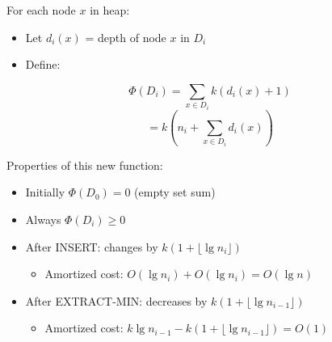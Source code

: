 \documentclass[11pt]{article}
\theoremstyle{definition}
\begin{document}
For each node $x$ in heap:
\begin{itemize}
  \item Let $d_i(x)$ = depth of node $x$ in $D_i$
  \item Define:
\end{itemize}

\[
\Phi(D_i) = \sum_{x \in D_i} k(d_i(x) + 1)
\]
\[
= k\left(n_i + \sum_{x \in D_i} d_i(x)\right)
\]

Properties of this new function:
\begin{itemize}
  \item Initially $\Phi(D_0) = 0$ (empty set sum)
  \item Always $\Phi(D_i) \geq 0$
  \item After INSERT: changes by $k(1 + \lfloor\lg n_i\rfloor)$
    \begin{itemize}
      \item Amortized cost: $O(\lg n_i) + O(\lg n_i) = O(\lg n)$
    \end{itemize}
  \item After EXTRACT-MIN: decreases by $k(1 + \lfloor\lg n_{i-1}\rfloor)$
    \begin{itemize}
      \item Amortized cost: $k \lg n_{i-1} - k(1 + \lfloor\lg n_{i-1}\rfloor) = O(1)$
    \end{itemize}
\end{itemize}
\end{document}
